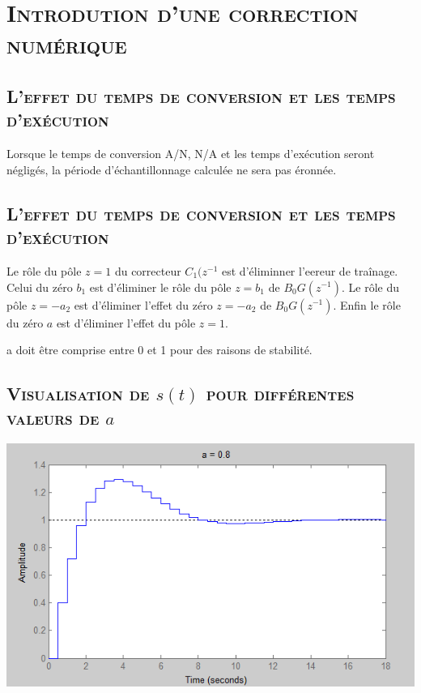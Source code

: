 \chapter{\textsc{Introdution d'une correction numérique }}
\section{\textsc{L'effet du temps de conversion et les temps d'exécution}}

\par Lorsque le temps de conversion A/N, N/A et les temps d'exécution seront négligés, la période d'échantillonnage calculée ne sera pas éronnée.\\

   \section{\textsc{L'effet du temps de conversion et les temps d'exécution}}
   
   \par Le rôle du pôle $z=1$ du correcteur $C_1(z^{-1}$ est d'éliminner l'eereur de traînage. Celui du zéro $b_1$ est d'éliminer le rôle du pôle $z=b_1$ de $B_0G(z^{-1})$. Le rôle du pôle $z=-a_2$ est d'éliminer l'effet du zéro $z=-a_2$ de $B_0G(z^{-1})$. Enfin le rôle du zéro $a$ est d'éliminer l'effet du pôle $z=1$.\\[0.5 cm]
   \par a doit être comprise entre 0 et 1 pour des raisons de stabilité.
   
   \section{\textsc{Visualisation de $s(t)$ pour différentes valeurs de $a$}}
   
   	\begin{center}
	\includegraphics[scale=0.5]{a8.png}
	\label{fig13} 
	\end{center}
	
